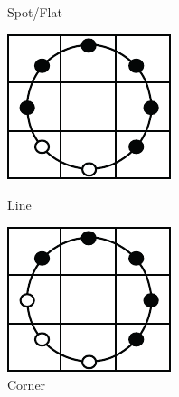 \begin{figure}[H]
\begin{minipage}[b]{.17\textwidth}
  \caption*{Spot/Flat}
\end{minipage}
\begin{minipage}[b]{.17\textwidth}
  \centering
  \includegraphics[width=.9\linewidth]{figures/lbp_line}
  \caption*{Line}
\end{minipage}
\begin{minipage}[b]{.17\textwidth}
  \centering
  \includegraphics[width=.9\linewidth]{figures/lbp_corner}
  \caption*{Corner}
\end{minipage}
\begin{minipage}[b]{.17\textwidth}
  \centering

\end{minipage}
\end{figure}
